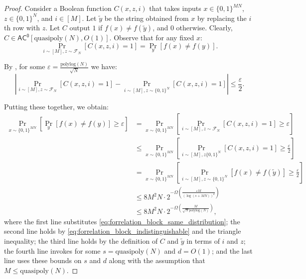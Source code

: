 \documentclass[11pt]{article}%
\newcommand{\eps}{\varepsilon}
\newcommand{\polylog}{\mathrm{polylog}}
\newcommand{\quasipoly}{\mathrm{quasipoly}}
\begin{document}
\begin{proof}
Consider a Boolean function $C(x, z, i)$ that takes inputs $x \in \{0,1\}^{MN}$, $z \in \{0,1\}^N$, and $i \in [M]$. Let $\tilde{y}$ be the string obtained from $x$ by replacing the $i$th row with $z$. Let $C$ output $1$ if $f(x) \neq f(\tilde{y})$, and $0$ otherwise. Clearly, $C \in \mathsf{AC^0}[\quasipoly(N), O(1)]$. Observe that for any fixed $x$:
\begin{equation}
\label{eq:forrelation_block_same_distribution}
\Pr_{i \sim [M],z \sim \mathcal{F}_N}\left[C(x, z, i) = 1\right] = \Pr_{y}[f(x) \neq f(y)].
\end{equation}

By , for some $\eps = \frac{\polylog(N)}{\sqrt{N}}$ we have:
\begin{equation}
\label{eq:forrelation_block_indistinguishable}
\left|\Pr_{i \sim [M],z \sim \mathcal{F}_N}\left[C(x, z, i) = 1\right] - \Pr_{i \sim [M],z \sim \{0,1\}^N}\left[C(x, z, i) = 1\right] \right| \le \frac{\eps}{2}.
\end{equation}

Putting these together, we obtain:
\begin{align*}
\Pr_{x \sim \{0,1\}^{MN}}\left[\Pr_y\left[f(x) \neq f(y)\right] \ge \eps \right]
&= \Pr_{x \sim \{0,1\}^{MN}}\left[\Pr_{i \sim [M], z \sim \mathcal{F}_N}\left[C(x, z, i) = 1\right] \ge \eps \right]\\
&\le \Pr_{x \sim \{0,1\}^{MN}}\left[\Pr_{i \sim [M], z \{0,1\}^N}\left[C(x, z, i) = 1\right] \ge \frac{\eps}{2} \right]\\
&= \Pr_{x \sim \{0,1\}^{MN}}\left[
\Pr_{i \sim [M],z \sim \{0,1\}^N}\left[f(x) \neq f(\tilde{y})\right]
\ge \frac{\eps}{2}
\right]\\
&\le 8M^2N \cdot 2^{-\Omega\left(\frac{\eps M}{(\log(s + MN))^d}\right)}\\
&\le 8M^2N \cdot 2^{-\Omega\left(\frac{M}{\sqrt{N} \polylog(N)}\right)},
\end{align*}
where the first line substitutes \eqref{eq:forrelation_block_same_distribution}; the second line holds by \eqref{eq:forrelation_block_indistinguishable} and the triangle inequality; the third line holds by the definition of $C$ and $\tilde{y}$ in terms of $i$ and $z$; the fourth line invokes  for some $s = \quasipoly(N)$ and $d = O(1)$; and the last line uses these bounds on $s$ and $d$ along with the assumption that $M \le \quasipoly(N)$.
\end{proof}
\end{document}
